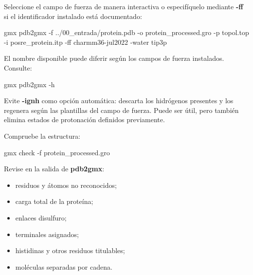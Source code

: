 \documentclass[
  spanish,
  11pt,
  a4paper]{article}
\newenvironment{Shaded}{\begin{snugshade}}{\end{snugshade}}
\newcommand{\AttributeTok}[1]{\textcolor[rgb]{0.13,0.29,0.53}{#1}}
\newcommand{\ExtensionTok}[1]{#1}
\newcommand{\NormalTok}[1]{#1}
\providecommand{\tightlist}{%
  \setlength{\itemsep}{0pt}\setlength{\parskip}{0pt}}
\begin{document}
Seleccione el campo de fuerza de manera interactiva o especifíquelo
mediante \textbf{-ff} si el identificador instalado está documentado:

\begin{Shaded}
\begin{Highlighting}[]
\ExtensionTok{gmx}\NormalTok{ pdb2gmx     }\AttributeTok{{-}f}\NormalTok{ ../00\_entrada/protein.pdb     }\AttributeTok{{-}o}\NormalTok{ protein\_processed.gro     }\AttributeTok{{-}p}\NormalTok{ topol.top     }\AttributeTok{{-}i}\NormalTok{ posre\_protein.itp     }\AttributeTok{{-}ff}\NormalTok{ charmm36{-}jul2022     }\AttributeTok{{-}water}\NormalTok{ tip3p}
\end{Highlighting}
\end{Shaded}

El nombre disponible puede diferir según los campos de fuerza
instalados. Consulte:

\begin{Shaded}
\begin{Highlighting}[]
\ExtensionTok{gmx}\NormalTok{ pdb2gmx }\AttributeTok{{-}h}
\end{Highlighting}
\end{Shaded}

Evite \textbf{-ignh} como opción automática: descarta los hidrógenos
presentes y los regenera según las plantillas del campo de fuerza. Puede
ser útil, pero también elimina estados de protonación definidos
previamente.

Compruebe la estructura:

\begin{Shaded}
\begin{Highlighting}[]
\ExtensionTok{gmx}\NormalTok{ check }\AttributeTok{{-}f}\NormalTok{ protein\_processed.gro}
\end{Highlighting}
\end{Shaded}

Revise en la salida de \textbf{pdb2gmx}:

\begin{itemize}
\tightlist
\item
  residuos y átomos no reconocidos;
\item
  carga total de la proteína;
\item
  enlaces disulfuro;
\item
  terminales asignados;
\item
  histidinas y otros residuos titulables;
\item
  moléculas separadas por cadena.
\end{itemize}
\end{document}
